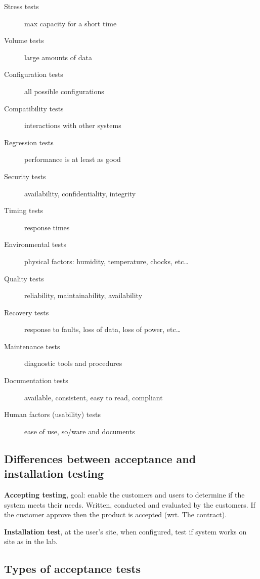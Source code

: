 \begin{description}
    \item[Stress tests] max capacity for a short time
    \item[Volume tests] large amounts of data
    \item[Configuration tests] all possible configurations
    \item[Compatibility tests] interactions with other systems
    \item[Regression tests] performance is at least as good
    \item[Security tests] availability, confidentiality, integrity
    \item[Timing tests] response times
    \item[Environmental tests] physical factors: humidity, temperature, chocks, etc\ldots
    \item[Quality tests] reliability, maintainability, availability
    \item[Recovery tests] response to faults, loss of data, loss of power, etc\ldots
    \item[Maintenance tests] diagnostic tools and procedures
    \item[Documentation tests] available, consistent, easy to read, compliant
    \item[Human factors (usability) tests] ease of use, so/ware and documents
\end{description}

\subsection{Differences between acceptance and installation testing}

\textbf{Accepting testing}, goal: enable the customers and users to determine if the system meets their needs. Written, conducted and evaluated by the customers. If the customer approve then the product is accepted (wrt. The contract). \newline

\textbf{Installation test}, at the user’s site, when configured, test if system works on site as in the lab.

\subsection{Types of acceptance tests}

